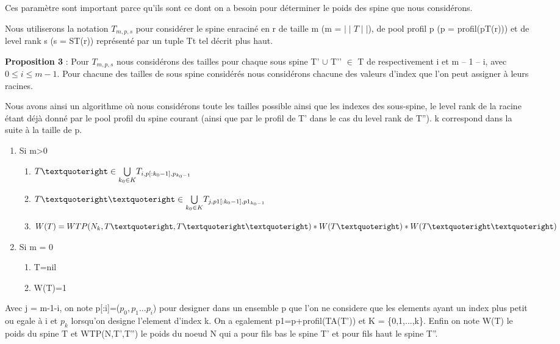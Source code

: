 \documentclass[french]{article}
\begin{document}
Ces paramètre sont important parce qu'ils sont ce dont on a besoin pour déterminer le poids des spine que nous considérons.

Nous utiliserons la notation \(T_{m,p,s} \) pour considérer le spine enraciné en r de taille m (m =  \(\mid\mid T\mid\mid\)), de pool profil p (p = profil(pT(r))) et de level rank s (s = ST(r)) représenté par un tuple Tt tel décrit plus haut.


\textbf{Proposition 3} :  Pour \(T_{m,p,s} \) nous considérons des tailles pour chaque sous spine T’ \(\cup\) T’’ \(\in\) T de respectivement i et m – 1 – i, avec \(0\leq i\leq m-1\). Pour chacune des tailles de sous spine considérés nous considérons chacune des valeurs d'index que l'on peut assigner à leurs racines.

Nous avons ainsi un algorithme où nous considérons toute les tailles possible ainsi que les indexes des sous-spine, le level rank de la racine étant déjà donné par le pool profil du spine courant (ainsi que par le profil de T' dans le cas du level rank de T''). k correspond dans la suite à la taille de p.
\newpage
\begin{enumerate}
    \item Si m>0
        \begin{enumerate}
            \item
            \(T\textquoteright \in \underset{k_0\in K}{\bigcup} T_{i,p[:k_0-1],p_{k_0-1}} \)
            \item
            \(T\textquoteright\textquoteright \in \underset{k_0\in K}{\bigcup} T_{j,p1[:k_0-1],p1_{k_0-1}} \)
            \item
            \(W(T)=WTP(N_k,T\textquoteright,T\textquoteright\textquoteright)*W(T\textquoteright)*W(T\textquoteright\textquoteright)\)
        \end{enumerate}
 
    \item Si m = 0
        \begin{enumerate} 
            \item
            T=nil 
            \item
            W(T)=1
        \end{enumerate}
\end{enumerate}
Avec j = m-1-i, on note p[:i]=(\(p_0,p_1...p_i\)) pour designer dans un ensemble p que l'on ne considere que les elements ayant un index plus petit ou egale à i et \(p_{k}\) lorsqu'on designe l'element d'index k. On a egalement p1=p+profil(TA(T')) et K = \{0,1,...,k\}. Enfin on note W(T) le poids du spine T et WTP(N,T',T'') le poids du noeud N qui a pour fils bas le spine T' et pour fils haut le spine T''.
\vspace{5mm} %
\end{document}
